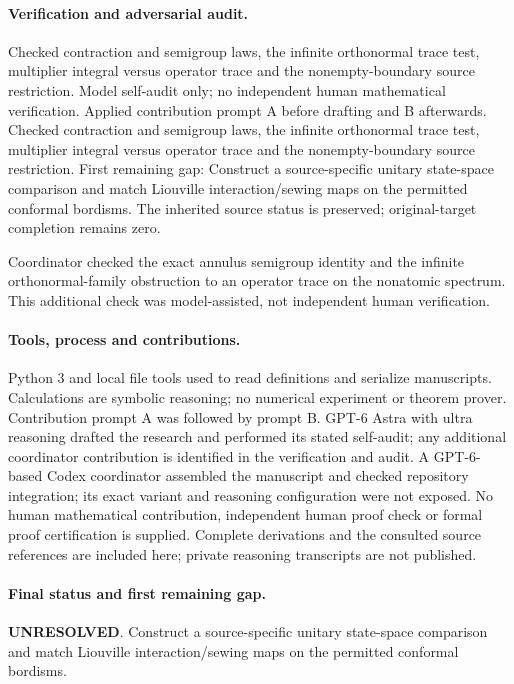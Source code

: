 \documentclass[11pt]{article}
\begin{document}
\paragraph{Verification and adversarial audit.}
Checked contraction and semigroup laws, the infinite orthonormal trace test, multiplier integral versus operator trace and the nonempty-boundary source restriction. Model self-audit only; no independent human mathematical verification. Applied contribution prompt A before drafting and B afterwards. Checked contraction and semigroup laws, the infinite orthonormal trace test, multiplier integral versus operator trace and the nonempty-boundary source restriction. First remaining gap: Construct a source-specific unitary state-space comparison and match Liouville interaction/sewing maps on the permitted conformal bordisms. The inherited source status is preserved; original-target completion remains zero.

Coordinator checked the exact annulus semigroup identity and the infinite orthonormal-family obstruction to an operator trace on the nonatomic spectrum. This additional check was model-assisted, not independent human verification.

\paragraph{Tools, process and contributions.}
Python 3 and local file tools used to read definitions and serialize manuscripts. Calculations are symbolic reasoning; no numerical experiment or theorem prover. Contribution prompt A was followed by prompt B. GPT-6 Astra with ultra reasoning drafted the research and performed its stated self-audit; any additional coordinator contribution is identified in the verification and audit. A GPT-6-based Codex coordinator assembled the manuscript and checked repository integration; its exact variant and reasoning configuration were not exposed. No human mathematical contribution, independent human proof check or formal proof certification is supplied. Complete derivations and the consulted source references are included here; private reasoning transcripts are not published.

\paragraph{Final status and first remaining gap.}
\textbf{UNRESOLVED}. Construct a source-specific unitary state-space comparison and match Liouville interaction/sewing maps on the permitted conformal bordisms.
\end{document}
